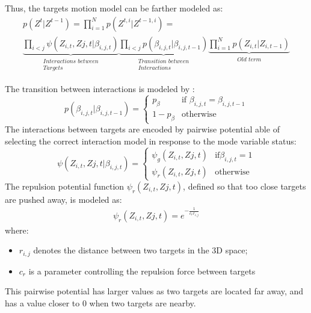 Thus, the targets motion model can be farther modeled as:
\begin{eqnarray}\label{eqn: transition factorized 2}
p(Z^{t} |Z^{t-1} ) = \prod_{i=1}^{N} p(Z^{t,i} | Z^{t-1,i})= \nonumber \\
\underbrace{\prod_{i<j} \psi(Z_{i,t} , Z{j,t} |\beta_{i,j,t})}_{\substack{\textit{Interactions between} \\ \textit{Targets}}}
\underbrace{\prod_{i<j} p(\beta_{i,j,t} |\beta_{i,j,t-1} ) }_{\substack{\textit{Transition between} \\ \textit{Interactions}}}
\underbrace{\prod_{i=1}^{N} p(Z_{i,t} |Z_{i,t-1})}_{\substack{\textit{Old term} }}
\end{eqnarray}

The transition between interactions is modeled by :
$$
 p(\beta_{i,j,t} |\beta_{i,j,t-1} )= \left\{
\begin{array}{rl}
 p_{\beta}  & \mbox{if } \beta_{i,j,t} = \beta_{i,j,t-1}  \\
 1- p_{\beta} & \mbox{otherwise}
\end{array}
\right.
$$
The interactions between targets are encoded by pairwise potential able of selecting
the correct interaction model in response to the mode variable status:
$$
\psi(Z_{i,t} , Z{j,t} | \beta_{i,j,t} )= \left\{
\begin{array}{rl}
 \psi_g(Z_{i,t} , Z{j,t}) & \mbox{if} \beta_{i,j,t}=1	 \\
 \psi_r(Z_{i,t} , Z{j,t}) & \mbox{otherwise}
\end{array}
\right.
$$
The repulsion potential function  $\psi_r(Z_{i,t} , Z{j,t})$, defined so that
too close targets are pushed away, is modeled as:
\begin{eqnarray}\label{eqn: transition factorized 2}
\psi_r(Z_{i,t} , Z{j,t}) = e^{-\frac{1}{c_r r_{i,j}}}
\end{eqnarray}
where:
\begin{itemize}
\item $r_{i,j}$ denotes the distance between two targets in the 3D space;
\item $c_r$ is a parameter controlling the repulsion force between targets
\end{itemize}
This pairwise potential has larger values as two targets are located far away, and has a value closer to $0$ when two targets are nearby.

